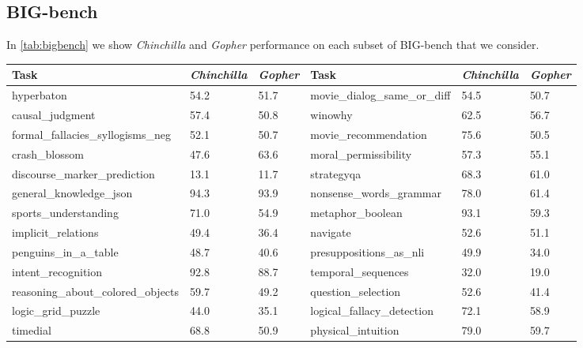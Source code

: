 \documentclass[11pt, a4paper, logo, copyright, nonumbering]{deepmind}
\newcommand{\gopher}{\textit{Gopher}\xspace}
\newcommand{\chinchilla}{\textit{Chinchilla}\xspace}
\newcommand{\bigbench}{BIG-bench\xspace}
\begin{document}
\subsection{\bigbench}
In \autoref{tab:bigbench} we show \chinchilla and \gopher performance on each subset of \bigbench that we consider.

\begin{table}[ht]
    \centering
    \small
\begin{tabular}{lll|lll}
\toprule
                                    Task &     \chinchilla &     \gopher &                                    Task &     \chinchilla &     \gopher \\
\midrule
                           hyperbaton &  54.2 &  51.7 &       movie\_dialog\_same\_or\_diff &  54.5 &  50.7 \\
                      causal\_judgment &  57.4 &  50.8 &                              winowhy &  62.5 &  56.7 \\
 formal\_fallacies\_syllogisms\_neg &  52.1 &  50.7 &                 movie\_recommendation &  75.6 &  50.5 \\
                        crash\_blossom &  47.6 &  63.6 &                 moral\_permissibility &  57.3 &  55.1 \\
          discourse\_marker\_prediction &  13.1 &  11.7 &                           strategyqa &  68.3 &  61.0 \\
               general\_knowledge\_json &  94.3 &  93.9 &               nonsense\_words\_grammar &  78.0 &  61.4 \\
                 sports\_understanding &  71.0 &  54.9 &                     metaphor\_boolean &  93.1 &  59.3 \\
                   implicit\_relations &  49.4 &  36.4 &                             navigate &  52.6 &  51.1 \\
                  penguins\_in\_a\_table &  48.7 &  40.6 &               presuppositions\_as\_nli &  49.9 &  34.0 \\
                   intent\_recognition &  92.8 &  88.7 &                   temporal\_sequences &  32.0 &  19.0 \\
      reasoning\_about\_colored\_objects &  59.7 &  49.2 &                   question\_selection &  52.6 &  41.4 \\
                    logic\_grid\_puzzle &  44.0 &  35.1 &            logical\_fallacy\_detection &  72.1 &  58.9 \\
                             timedial &  68.8 &  50.9 &                   physical\_intuition &  79.0 &  59.7 \\

\end{tabular}
\end{table}
\end{document}
